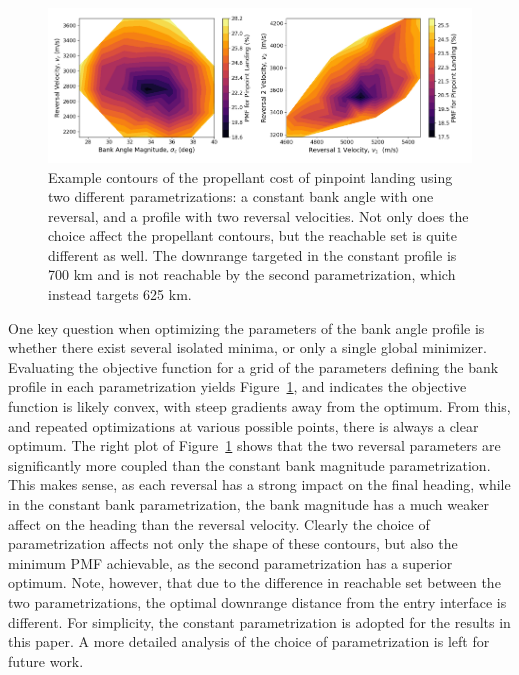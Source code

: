 \documentclass[letterpaper, paper,11pt]{AAS}
\begin{document}
\begin{figure}[h!]
		\centering
		\includegraphics[width=1\textwidth]{ObjectiveContours} 
		\caption{Example contours of the propellant cost of pinpoint landing using two different parametrizations: a constant bank angle with one reversal, and a profile with two reversal velocities. Not only does the choice affect the propellant contours, but the reachable set is quite different as well. The downrange targeted in the constant profile is 700 km and is not reachable by the second parametrization, which instead targets 625 km. }
		\label{fig_objective_contour}
\end{figure}
One key question when optimizing the parameters of the bank angle profile is whether there exist several isolated minima, or only a single global minimizer. 
Evaluating the objective function for a grid of the parameters defining the bank profile in each parametrization yields Figure~\ref{fig_objective_contour}, and indicates the objective function is likely convex, with steep gradients away from the optimum. From this, and repeated optimizations at various possible points, there is always a clear optimum.  The right plot of Figure~\ref{fig_objective_contour} shows that the two reversal parameters are significantly more coupled than the constant bank magnitude parametrization. This makes sense, as each reversal has a strong impact on the final heading, while in the constant bank parametrization, the bank magnitude has a much weaker affect on the heading than the reversal velocity. Clearly the choice of parametrization affects not only the shape of these contours, but also the minimum PMF achievable, as the second parametrization has a superior optimum. Note, however, that due to the difference in reachable set between the two parametrizations, the optimal downrange distance from the entry interface is different. For simplicity, the constant parametrization is adopted for the results in this paper. A more detailed analysis of the choice of parametrization is left for future work.
\end{document}
